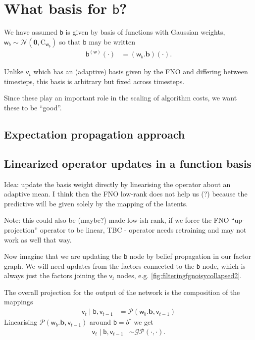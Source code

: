 \documentclass{article}
\newcommand{\vv}[1]{\boldsymbol{#1}}
\newcommand{\mm}[1]{\mathrm{#1}}
\newcommand{\rv}[1]{\mathsf{#1}}
\newcommand{\vrv}[1]{\vv{\rv{#1}}}
\newcommand{\dist}[1]{\mathcal{#1}}
\newcommand{\op}[1]{\mathscr{#1}}
\newcommand{\gvn}{\mid}
\newcommand{\lat}{\rv{b}}   %
\newcommand{\latst}{b}      %
\begin{document}
\section{What basis for \(\lat\)?}

We have assumed \(\lat\) is given by basis of functions with Gaussian weights,
\(\vrv{w}_{\latst} \sim \dist{N}\left(\vv{0}, \mm{C}_{\vrv{w}_{\latst}}\right)\) so that  \(\lat\) may be written
\begin{align*}
  \lat^{(\vrv{w})}(\cdot) &= (\vrv{w}_{\latst}.\vv{\latst})(\cdot).
\end{align*}

Unlike \(\rv{v}_{t}\) which has an (adaptive) basis given by the FNO and differing between timesteps, this basis is arbitrary but fixed across timesteps.

Since these play an important role in the scaling of algorithm costs, we want these to be ``good''.


\subsection{Expectation propagation approach}


\subsection{Linearized operator updates in a function basis}

Idea: update the basis weight directly by linearising the operator about an adaptive mean.
I think then the FNO low-rank does not help us (?) because the predictive will be given solely by the mapping of the latents.

Note: this could also be (maybe?) made low-ish rank, if we force the FNO ``up-projection'' operator to be linear,
TBC - operator needs retraining and may not work as well that way.

Now imagine that we are updating the \(\lat\) node by belief propagation in our factor graph.
We will need updates from the factors connected to the \(\lat\) node, which is always just the factors joining the \(\rv{v}_{t}\) nodes, e.g. \autoref{fig:filteringfgnoisycollapsed2}.

The overall projection for the output of the network is the composition of the mappings
\begin{align*}
\rv{v}_{t}\gvn \lat,\rv{v}_{t-1}
&= \op{P}(\vrv{w}_{\latst}.\vv{\latst},\rv{v}_{t-1})
\end{align*}
Linearising \(\op{P}(\vrv{w}_{\latst}.\vv{\latst},\rv{v}_{t-1})\) around \(\lat=\latst^\dagger \) we get
\begin{align*}
\rv{v}_{t}\gvn \lat,\rv{v}_{t-1} &\sim
\dist{GP}\left(
  \cdot,
  \cdot
 \right).
\end{align*}
\end{document}
